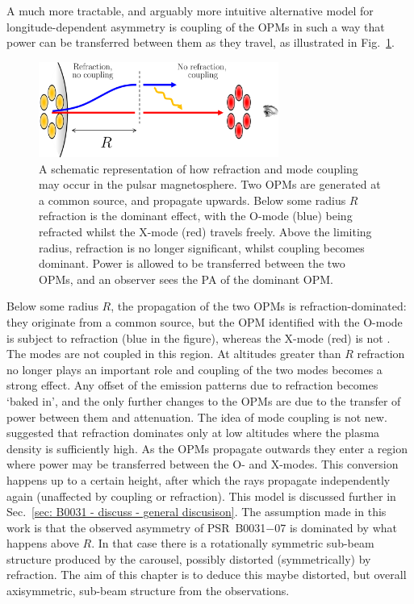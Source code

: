 A much more tractable, and arguably more intuitive alternative model for longitude-dependent asymmetry is coupling of the OPMs in such a way that power can be transferred between them as they travel, as illustrated in Fig.~\ref{fig: B0031 - coupling schematic}.
\begin{figure}
    \begin{center}
        \includegraphics[width=0.7\textwidth]{Figures/B0031/coupling_schematic2}
        \caption[Schematic view of propagation of two OPMs through the magnetosphere]{A schematic representation of how refraction and mode coupling may occur in the pulsar magnetosphere. Two OPMs are generated at a common source, and propagate upwards. Below some radius $R$ refraction is the dominant effect, with the O-mode (blue) being refracted whilst the X-mode (red) travels freely. Above the limiting radius, refraction is no longer significant, whilst coupling becomes dominant. Power is allowed to be transferred between the two OPMs, and an observer sees the PA of the dominant OPM.}
        \label{fig: B0031 - coupling schematic}
    \end{center}
\end{figure}
Below some radius $R$, the propagation of the two OPMs is refraction-dominated: they originate from a common source, but the OPM identified with the O-mode is subject to refraction (blue in the figure), whereas the X-mode (red) is not \citep{ABxx1986}. The modes are not coupled in this region. At altitudes greater than $R$ refraction no longer plays an important role and coupling of the two modes becomes a strong effect. Any offset of the emission patterns due to refraction becomes `baked in', and the only further changes to the OPMs are due to the transfer of power between them and attenuation.
The idea of mode coupling is not new. \citet{Pxxx2000} suggested that refraction dominates only at low altitudes where the plasma density is sufficiently high. As the OPMs propagate outwards they enter a region where power may be transferred between the O- and X-modes. This conversion happens up to a certain height, after which the rays propagate independently again (unaffected by coupling or refraction). This model is discussed further in Sec.~\ref{sec: B0031 - discuss - general discusison}.
The assumption made in this work is that the observed asymmetry of PSR~B0031$-$07 is dominated by what happens above $R$. In that case there is a rotationally symmetric sub-beam structure produced by the carousel, possibly distorted (symmetrically) by refraction. The aim of this chapter is to deduce this maybe distorted, but overall axisymmetric, sub-beam structure from the observations.

